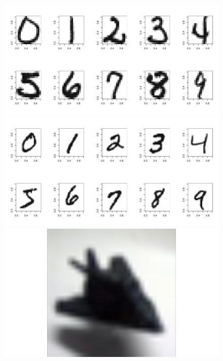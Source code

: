 \begin{figure}
 \begin{minipage}{0.32\textwidth}
  \includegraphics[width=\textwidth]{../plots/zip_dataset}
 \end{minipage}
 \begin{minipage}{0.32\textwidth}
  \includegraphics[width=\textwidth]{../plots/mnist_dataset}
 \end{minipage}
 \begin{minipage}{0.32\textwidth}
  \begin{minipage}{0.18\textwidth}
    \includegraphics[width=1.2\textwidth]{../plots/cifar10-class0}

\end{minipage}
\end{minipage}
\end{figure}
